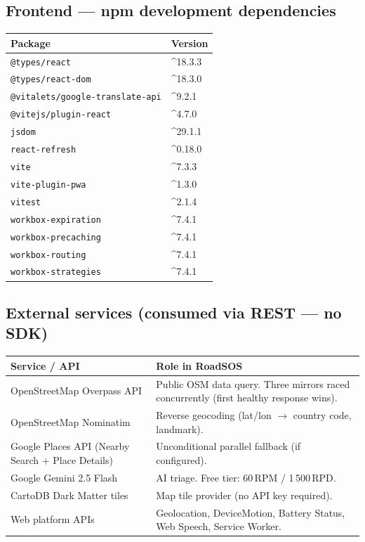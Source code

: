 \documentclass[11pt, a4paper]{article}
\newcommand{\code}[1]{\texttt{\small#1}}
\begin{document}
\subsection{Frontend --- npm development dependencies}
\begin{tabular}{ll}
\toprule
\textbf{Package} & \textbf{Version} \\
\midrule
  \code{@types/react} & \textasciicircum{}18.3.3 \\
  \code{@types/react-dom} & \textasciicircum{}18.3.0 \\
  \code{@vitalets/google-translate-api} & \textasciicircum{}9.2.1 \\
  \code{@vitejs/plugin-react} & \textasciicircum{}4.7.0 \\
  \code{jsdom} & \textasciicircum{}29.1.1 \\
  \code{react-refresh} & \textasciicircum{}0.18.0 \\
  \code{vite} & \textasciicircum{}7.3.3 \\
  \code{vite-plugin-pwa} & \textasciicircum{}1.3.0 \\
  \code{vitest} & \textasciicircum{}2.1.4 \\
  \code{workbox-expiration} & \textasciicircum{}7.4.1 \\
  \code{workbox-precaching} & \textasciicircum{}7.4.1 \\
  \code{workbox-routing} & \textasciicircum{}7.4.1 \\
  \code{workbox-strategies} & \textasciicircum{}7.4.1 \\
\bottomrule
\end{tabular}


\subsection{External services (consumed via REST --- no SDK)}

\begin{tabularx}{\textwidth}{lX}
\toprule
\textbf{Service / API} & \textbf{Role in RoadSOS} \\
\midrule
OpenStreetMap Overpass API & Public OSM data query. Three mirrors raced concurrently (first healthy response wins). \\
OpenStreetMap Nominatim & Reverse geocoding (lat/lon $\to$ country code, landmark). \\
Google Places API (Nearby Search + Place Details) & Unconditional parallel fallback (if configured). \\
Google Gemini 2.5 Flash & AI triage. Free tier: 60\,RPM / 1\,500\,RPD. \\
CartoDB Dark Matter tiles & Map tile provider (no API key required). \\
Web platform APIs & Geolocation, DeviceMotion, Battery Status, Web Speech, Service Worker. \\
\bottomrule
\end{tabularx}
\end{document}
